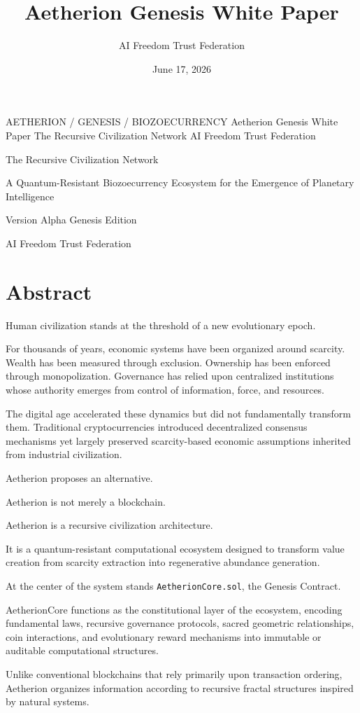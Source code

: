 ﻿\documentclass[12pt]{article}
\title{Aetherion Genesis White Paper}
\author{AI Freedom Trust Federation}
\date{June 17, 2026}
\begin{document}
\aftTitlePage
  {AETHERION / GENESIS / BIOZOECURRENCY}
  {Aetherion Genesis White Paper}
  {The Recursive Civilization Network}
  {AI Freedom Trust Federation}

\tableofcontents
\newpage


The Recursive Civilization Network

A Quantum-Resistant Biozoecurrency Ecosystem for the Emergence of Planetary Intelligence

Version Alpha Genesis Edition

AI Freedom Trust Federation

\section{Abstract}


Human civilization stands at the threshold of a new evolutionary epoch.

For thousands of years, economic systems have been organized around scarcity. Wealth has been measured through exclusion. Ownership has been enforced through monopolization. Governance has relied upon centralized institutions whose authority emerges from control of information, force, and resources.

The digital age accelerated these dynamics but did not fundamentally transform them. Traditional cryptocurrencies introduced decentralized consensus mechanisms yet largely preserved scarcity-based economic assumptions inherited from industrial civilization.

Aetherion proposes an alternative.

Aetherion is not merely a blockchain.

Aetherion is a recursive civilization architecture.

It is a quantum-resistant computational ecosystem designed to transform value creation from scarcity extraction into regenerative abundance generation.

At the center of the system stands \texttt{AetherionCore.sol}, the Genesis Contract.

AetherionCore functions as the constitutional layer of the ecosystem, encoding fundamental laws, recursive governance protocols, sacred geometric relationships, coin interactions, and evolutionary reward mechanisms into immutable or auditable computational structures.

Unlike conventional blockchains that rely primarily upon transaction ordering, Aetherion organizes information according to recursive fractal structures inspired by natural systems.
\end{document}
